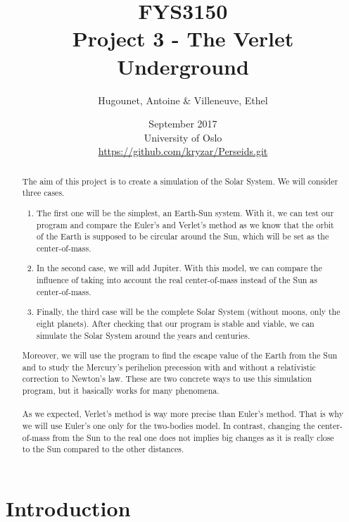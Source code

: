 \documentclass[a4paper, twoside, 11pt]{report}
\title{FYS3150\\Project 3 - The Verlet Underground}
\author{Hugounet, Antoine \& Villeneuve, Ethel}
\date{September 2017 \\University of Oslo \\ \url{https://github.com/kryzar/Perseids.git}}
\theoremstyle{theorem}
\theoremstyle{remark}
\theoremstyle{exemple}
\begin{document}
\maketitle
	
	
\begin{abstract}

	\paragraph{}The aim of this project is to create a simulation of the Solar System. We will consider three cases.
		\begin{enumerate}
			\item{The first one will be the simplest, an Earth-Sun system. With it, we can test our program and compare the Euler's and Verlet's method as we know that the orbit of the Earth is supposed to be circular around the Sun, which will be set as the center-of-mass.}
			\item{In the second case, we will add Jupiter. With this model, we can compare the influence of taking into account the real center-of-mass instead of the Sun as center-of-mass.}
			\item{Finally, the third case will be the complete Solar System (without moons, only the eight planets). After checking that our program is stable and viable, we can simulate the Solar System around the years and centuries.}
		\end{enumerate}
		
	Moreover, we will use the program to find the escape value of the Earth from the Sun and to study the Mercury's perihelion precession with and without a relativistic correction to Newton's law. These are two concrete ways to use this simulation program, but it basically works for many phenomena.
	
	\paragraph{}As we expected, Verlet's method is way more precise than Euler's method. That is why we will use Euler's one only for the two-bodies model. In contrast, changing the center-of-mass from the Sun to the real one does not implies big changes as it is really close to the Sun compared to the other distances.  
	
\end{abstract}


\tableofcontents


\chapter*{Introduction}
\end{document}
